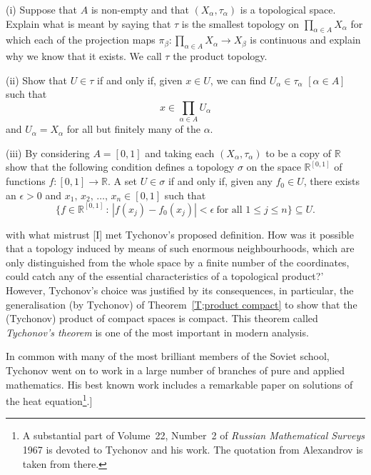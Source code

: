 \begin{exercise}\label{E;Infinite product}
(i) Suppose that $A$ is non-empty and that $(X_{\alpha},\tau_{\alpha})$
is a topological space. Explain what is meant by saying that
$\tau$ is the smallest topology on
$\prod_{\alpha\in A}X_{\alpha}$ for which each of the projection maps
$\pi_{\beta}:\prod_{\alpha\in A}X_{\alpha}\rightarrow X_{\beta}$
is continuous and explain why we know that it exists.
We call $\tau$ the product topology.

(ii) Show that $U\in\tau$ if and only if,
given $x\in U$, 
we can find $U_{\alpha}\in\tau_{\alpha}$ $[\alpha\in A]$
such that
\[x\in\prod_{\alpha\in A}U_{\alpha}\]
and $U_{\alpha}=X_{\alpha}$ for all but finitely many of the $\alpha$.

(iii) By considering $A=[0,1]$ and taking each $(X_{\alpha},\tau_{\alpha})$ 
to be a copy of ${\mathbb R}$ show that the following 
condition defines a topology $\sigma$
on the space ${\mathbb R}^{[0,1]}$ of functions 
$f:[0,1]\rightarrow{\mathbb R}$.
A set $U\in\sigma$ if and only if, given any $f_{0}\in U$,
there exists an $\epsilon>0$
and $x_{1},\,x_{2},\,\dots,\,x_{n}\in[0,1]$ such that
\[\{f\in {\mathbb R}^{[0,1]}\,:\,
|f(x_{j})-f_{0}(x_{j})|<\epsilon
\ \text{for all $1\leq j\leq n$}\}\subseteq U.\]


\noindent[The reader who can not see the point of this topology
is in good, but mistaken, company. The great topologist
Alexandrov recalled that when Tychonov (then aged only~20)
produced this definition 'His chosen \dots definition seemed
not only unexpected but perfectly paradoxical. [I remember]
with what mistrust [I] met Tychonov's proposed definition.
How was it possible that a topology induced by means of
such enormous neighbourhoods, which are only distinguished 
from the whole space by a finite number of the coordinates,
could catch any of the essential characteristics of a
topological product?' However, Tychonov's choice was justified
by its consequences, in particular, the generalisation (by Tychonov)
of Theorem~\ref{T;product compact} to show that the 
(Tychonov) product of compact spaces is compact.
This theorem called \emph{Tychonov's theorem} is
one of the most important in modern analysis.

In common with many of the most brilliant members
of the Soviet school, Tychonov went on to work in
a large number of branches of pure and applied
mathematics. His best known work includes a remarkable
paper on solutions of the heat 
equation\footnote{A substantial part of Volume~22, Number~2
of \emph{Russian Mathematical Surveys} 1967 is devoted
to Tychonov and his work. The quotation from Alexandrov
is taken from there.}.]  
\end{exercise}
